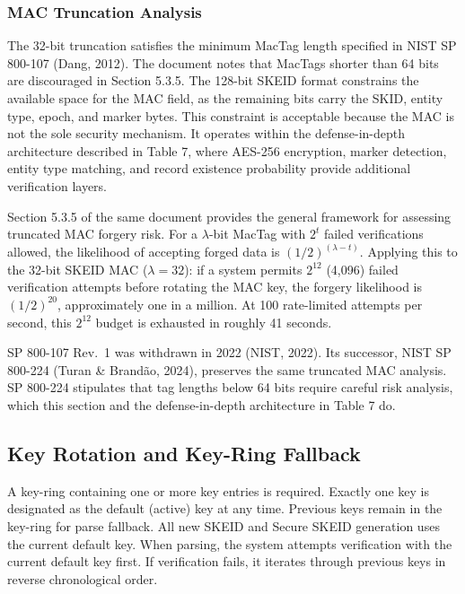 \documentclass[fleqn,10pt,lineno]{wlpeerj}
\begin{document}
\subsubsection{MAC Truncation Analysis}\label{mac-truncation-analysis}

The 32-bit truncation satisfies the minimum MacTag length specified in
NIST SP 800-107 (Dang, 2012). The document notes that MacTags shorter
than 64 bits are discouraged in Section 5.3.5. The 128-bit SKEID format
constrains the available space for the MAC field, as the remaining bits
carry the SKID, entity type, epoch, and marker bytes. This constraint is
acceptable because the MAC is not the sole security mechanism. It
operates within the defense-in-depth architecture described in Table 7,
where AES-256 encryption, marker detection, entity type matching, and
record existence probability provide additional verification layers.

Section 5.3.5 of the same document provides the general framework for
assessing truncated MAC forgery risk. For a \(\lambda\)-bit MacTag with
\(2^t\) failed verifications allowed, the likelihood of accepting forged
data is \((1/2)^{(\lambda - t)}\). Applying this to the 32-bit SKEID MAC
(\(\lambda = 32\)): if a system permits \(2^{12}\) (4,096) failed
verification attempts before rotating the MAC key, the forgery
likelihood is \((1/2)^{20}\), approximately one in a million. At 100
rate-limited attempts per second, this \(2^{12}\) budget is exhausted in
roughly 41 seconds.

SP 800-107 Rev.~1 was withdrawn in 2022 (NIST, 2022). Its successor,
NIST SP 800-224 (Turan \& Brandão, 2024), preserves the same truncated
MAC analysis. SP 800-224 stipulates that tag lengths below 64 bits
require careful risk analysis, which this section and the
defense-in-depth architecture in Table 7 do.

\subsection{Key Rotation and Key-Ring
Fallback}\label{key-rotation-and-key-ring-fallback}

A key-ring containing one or more key entries is required. Exactly one
key is designated as the default (active) key at any time. Previous keys
remain in the key-ring for parse fallback. All new SKEID and Secure
SKEID generation uses the current default key. When parsing, the system
attempts verification with the current default key first. If
verification fails, it iterates through previous keys in reverse
chronological order.
\end{document}
